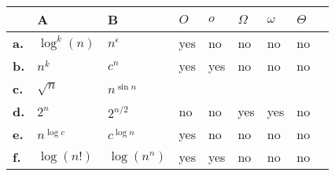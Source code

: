 \documentclass[12pt,letterpaper,final]{report}
\begin{document}
\begin{center}
\begin{tabular}{| m{1em} | m{4em}  m{4em}| m{2.5em} | m{2.5em}| m{2.5em}| m{2.5em}| m{2.5em}| m{2.5em}| } 
    \hline
        & \textbf{A} & \textbf{B} & \textbf{$O$} & \textbf{$o$} & \textbf{$\Omega$} & \textbf{$\omega$} & \textbf{$\Theta$}\\ 
    \hline
        \textbf{a.} & $\log^k(n)$ & $n^\epsilon$ & yes & no & no & no & no\\
    \hline
        \textbf{b.} & $n^k$ & $c^n$ & yes & yes & no & no & no\\
    \hline 
        \textbf{c.} & $\sqrt{n}$ &  $n^{\sin{n}}$ & & & & & \\
    \hline 
        \textbf{d.} & $2^n$ & $2^{n/2}$ & no & no & yes & yes & no\\
    \hline
        \textbf{e.} & $n^{\log c}$ & $c^{\log n}$ & yes & no & no & no & no\\
    \hline
        \textbf{f.} & $\log (n!)$ & $\log (n^n)$ & yes & yes & no & no & no\\
    \hline
\end{tabular}
\end{center}

\bigskip
\end{document}
